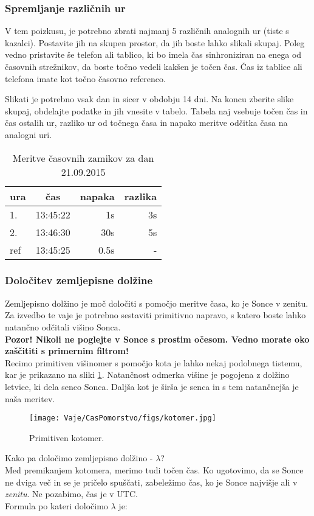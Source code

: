 \subsubsection{Spremljanje različnih ur}
V tem poizkusu, je potrebno zbrati najmanj 5 različnih analognih ur (tiste s kazalci). Postavite jih na skupen prostor, da jih boste lahko slikali skupaj. Poleg vedno pristavite še telefon ali tablico, ki bo imela čas sinhroniziran na enega od časovnih strežnikov, da boste točno vedeli kakšen je točen čas. Čas iz tablice ali telefona imate kot točno časovno referenco. 

Slikati je potrebno vsak dan in sicer v obdobju 14 dni. Na koncu zberite slike skupaj, obdelajte podatke in jih vnesite v tabelo. Tabela naj vsebuje točen čas in čas ostalih ur, razliko ur od točnega časa in napako meritve odčitka časa na analogni uri.

\begin{table}
	\centering
	\caption{Meritve časovnih zamikov za dan 21.09.2015}
	\label{tab:v_cas_meritev} 
	\begin{tabular}{l||c|r|r}
		\hline
		ura & čas & napaka & razlika  \\
	    \hline\hline\noalign{\smallskip}
		1.  & 13:45:22 & 1s   & 3s\\
		2.  & 13:46:30 & 30s  & 5s\\
		ref & 13:45:25 & 0.5s & - 
	\end{tabular}
\end{table}

\subsubsection{Določitev zemljepisne dolžine}
Zemljepisno dolžino je moč določiti s pomočjo meritve časa, ko je Sonce v zenitu. Za izvedbo te vaje je potrebno sestaviti primitivno napravo, s katero boste lahko natančno odčitali višino Sonca.\\[2mm]
%
\textbf{Pozor! Nikoli ne poglejte v Sonce s prostim očesom. Vedno morate oko zaščititi s primernim filtrom!}\\[2mm]
%
Recimo primitiven višinomer s pomočjo kota je lahko nekaj podobnega tistemu, kar je prikazano na sliki \ref{fig:v_cas_kotomer}. Natančnost odmerka višine je pogojena z dolžino letvice, ki dela senco Sonca. Daljša kot je širša je senca in s tem natančnejša je naša meritev. 
%
\begin{figure}[!htbp]
	\centering \texttt{[image: Vaje/CasPomorstvo/figs/kotomer.jpg]}
	\caption{Primitiven kotomer.}
	\label{fig:v_cas_kotomer}
\end{figure}
%
Kako pa določimo zemljepisno dolžino - $\lambda$?\\[2mm]
%
Med premikanjem kotomera, merimo tudi točen čas. Ko ugotovimo, da se Sonce ne dviga več in se je pričelo spuščati, zabeležimo čas, ko je Sonce najvišje ali v \emph{zenitu}. Ne pozabimo, čas je v UTC.\\[2mm]
%
Formula po kateri določimo $\lambda$ je:


